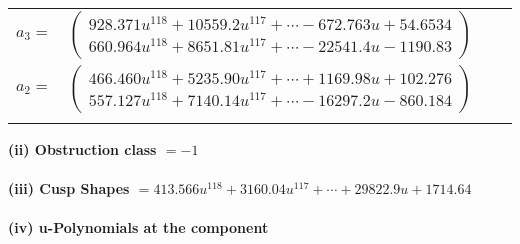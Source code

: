 \documentclass[1p]{elsarticle_modified}
\theoremstyle{definition}
\begin{document}
\begin{tabular}{m{7pt} m{180pt} m{7pt} m{180pt} }
\flushright $a_{3}=$&$\begin{pmatrix}928.371 u^{118}+10559.2 u^{117}+\cdots-672.763 u+54.6534\\660.964 u^{118}+8651.81 u^{117}+\cdots-22541.4 u-1190.83\end{pmatrix}$ \\
\flushright $a_{2}=$&$\begin{pmatrix}466.460 u^{118}+5235.90 u^{117}+\cdots+1169.98 u+102.276\\557.127 u^{118}+7140.14 u^{117}+\cdots-16297.2 u-860.184\end{pmatrix}$\\&\end{tabular}
\flushleft \textbf{(ii) Obstruction class $= -1$}\\~\\
\flushleft \textbf{(iii) Cusp Shapes $= 413.566 u^{118}+3160.04 u^{117}+\cdots+29822.9 u+1714.64$}\\~\\
\newpage\renewcommand{\arraystretch}{1}
\flushleft \textbf{(iv) u-Polynomials at the component}\newline \\
\end{document}
